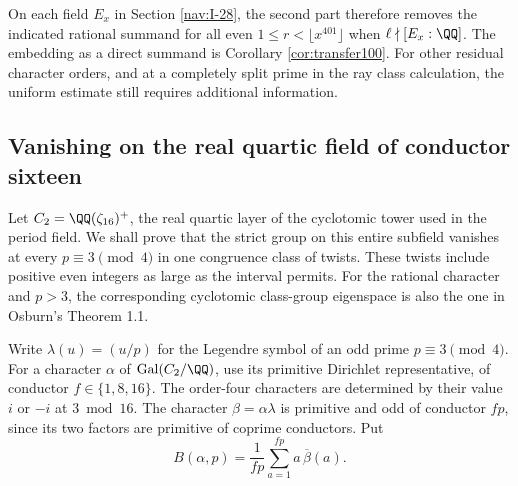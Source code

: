 \documentclass[a4paper,11pt]{article}
\theoremstyle{definition}
\theoremstyle{remark}
\numberwithin{equation}{section}
\begin{document}
On each field \(E_x\) in Section \ref{nav:I-28}, the second part
therefore removes the indicated rational summand for all even
\(1\le r<\lfloor x^{401}\rfloor\) when \(\ell\nmid[E_x:\QQ]\).
The embedding as a direct summand is Corollary \ref{cor:transfer100}.
For other residual character orders, and at a completely split
prime in the ray class calculation, the uniform estimate still
requires additional information.

\subsection{Vanishing on the real quartic field of conductor sixteen}\label{nav:III-17}
\label{sec:quartic115}

Let \(C_2=\QQ(\zeta_{16})^+\), the real quartic layer of the
cyclotomic tower used in the period field. We shall prove that
the strict group on this entire subfield vanishes at every
\(p\equiv3\pmod4\) in one congruence class of twists. These
twists include positive even integers as large as the interval
permits. For the rational character and \(p>3\), the corresponding
cyclotomic class-group eigenspace is also the one in Osburn's
Theorem 1.1.~\cite{V-III-V-osburn115}

Write \(\lambda(u)=(u/p)\) for the Legendre symbol of an odd
prime \(p\equiv3\pmod4\). For a character \(\alpha\) of
\(\operatorname{Gal}(C_2/\QQ)\), use its primitive Dirichlet
representative, of conductor \(f\in\{1,8,16\}\).
The order-four characters are determined by their value \(i\)
or \(-i\) at \(3\bmod16\). The character
\(\beta=\alpha\lambda\) is primitive and odd of conductor \(fp\),
since its two factors are primitive of coprime conductors. Put
\[
 B(\alpha,p)=\frac1{fp}\sum_{a=1}^{fp}a\,\overline{\beta}(a).
\]
\end{document}
